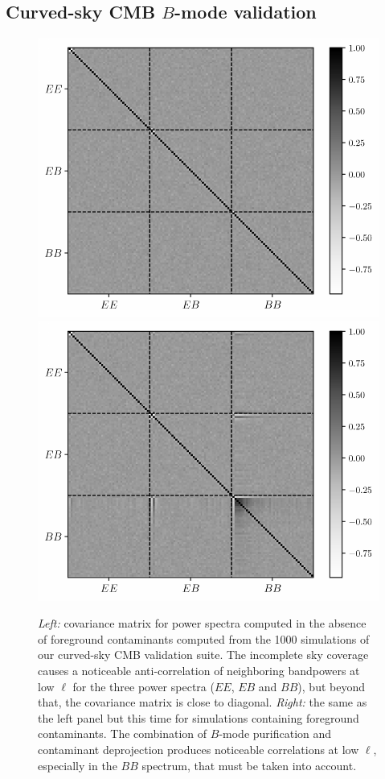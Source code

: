 \documentclass[usenatbib]{mnrasb}
\begin{document}
    \subsection{Curved-sky CMB \texorpdfstring{$B$}{B}-mode validation}\label{ssec:validation.cmb_full}
      \begin{figure}
        \centering
        \includegraphics[width=0.99\columnwidth]{val_covar_cmb_sph_nocont}
        \includegraphics[width=0.99\columnwidth]{val_covar_cmb_sph}
        \caption{{\sl Left:} covariance matrix for power spectra computed in the absence of foreground contaminants computed from the 1000 simulations of our curved-sky CMB validation suite. The incomplete sky coverage causes a noticeable anti-correlation of neighboring bandpowers at low $\ell$ for the three power spectra ($EE$, $EB$ and $BB$), but beyond that, the covariance matrix is close to diagonal. {\sl Right:} the same as the left panel but this time for simulations containing foreground contaminants. The combination of $B$-mode purification and contaminant deprojection produces noticeable correlations at low $\ell$, especially in the $BB$ spectrum, that must be taken into account.} \label{fig:cmb_val_cov}
      \end{figure}
\end{document}
